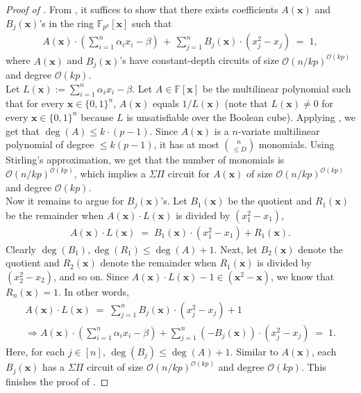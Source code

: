 \documentclass[11pt]{article}
\newcommand{\Boo}{\{0,1 \}}
\newcommand{\bigO}{\mathcal{O}}
\newcommand{\paren}[1]{\left( #1 \right)}
\newcommand{\F}{\mathbb{F}}
\begin{document}
\begin{proof}[Proof of ]
From , it suffices to show that there exists coefficients $A(\mathbf{x})$ and $B_{j}(\mathbf{x})$'s in the ring $\F_{p^{k}}[\mathbf{x}]$ such that
\begin{align*}
    A(\mathbf{x}) \cdot \paren{\sum_{i=1}^{n} \alpha_{i} x_{i} - \beta} \, + \, \sum_{j=1}^{n} B_{j}(\mathbf{x}) \cdot (x_{j}^{2} - x_{j}) \; = \; 1,
\end{align*}
where $A(\mathbf{x})$ and $B_{j}(\mathbf{x})$'s have constant-depth circuits of size $\bigO(n/kp)^{\bigO(kp)}$ and degree $\bigO(kp)$.\\

Let $L(\mathbf{x}) := \sum_{i=1}^{n} \alpha_{i} x_{i} - \beta$. Let $A \in \F[\mathbf{x}]$ be the multilinear polynomial such that for every $\mathbf{x} \in \Boo^{n}$, $A(\mathbf{x})$ equals $1/L(\mathbf{x})$ (note that $L(\mathbf{x}) \neq 0$ for every $\mathbf{x} \in \Boo^{n}$ because $L$ is unsatisfiable over the Boolean cube). Applying , we get that $\deg(A) \leq k\cdot(p-1)$.\newline
Since $A(\mathbf{x})$ is a $n$-variate multilinear polynomial of degree $\leq k(p-1)$, it has at most $\binom{n}{\leq D}$ monomials. Using Stirling's approximation, we get that the number of monomials is $\bigO(n/kp)^{\bigO(kp)}$, which implies a $\Sigma \Pi$ circuit for $A(\mathbf{x})$ of size $\bigO(n/kp)^{\bigO(kp)}$ and degree $\bigO(kp)$.\\

\noindent
Now it remains to argue for $B_{j}(\mathbf{x})$'s. Let $B_{1}(\mathbf{x})$ be the quotient and $R_{1}(\mathbf{x})$ be the remainder when $A(\mathbf{x}) \cdot L(\mathbf{x})$ is divided by $(x_{1}^{2}-x_{1})$,
\begin{align*}
    A(\mathbf{x}) \cdot L(\mathbf{x}) \; = \; B_{1}(\mathbf{x}) \cdot (x_{1}^{2} - x_{1}) + R_{1}(\mathbf{x}).
\end{align*}
Clearly $\deg(B_{1}), \deg(R_{1}) \leq \deg(A) + 1$. Next, let $B_{2}(\mathbf{x})$ denote the quotient and $R_{2}(\mathbf{x})$ denote the remainder when $R_{1}(\mathbf{x})$ is divided by $(x_{2}^{2} - x_{2})$, and so on. Since $A(\mathbf{x}) \cdot L(\mathbf{x}) - 1 \in (\mathbf{x}^{2} - \mathbf{x})$, we know that $R_{n}(\mathbf{x}) = 1$. In other words,
\begin{align*}
    A(\mathbf{x}) \cdot L(\mathbf{x}) \; = \; \sum_{j=1}^{n} B_{j}(\mathbf{x}) \cdot (x_{j}^{2} - x_{j}) + 1  \\
    \Rightarrow A(\mathbf{x}) \cdot \paren{\sum_{i=1}^{n} \alpha_{i} x_{i} - \beta} + \sum_{j=1}^{n} (-B_{j}(\mathbf{x})) \cdot (x_{j}^{2} - x_{j}) \; = \; 1.
\end{align*}
Here, for each $j \in [n]$, $\deg(B_{j})\leq \deg(A) + 1$. Similar to $A(\mathbf{x})$, each $B_{j}(\mathbf{x})$ has a $\Sigma \Pi$ circuit of size $\bigO(n/kp)^{\bigO(kp)}$ and degree $\bigO(kp)$. This finishes the proof of .
\end{proof}
\end{document}
